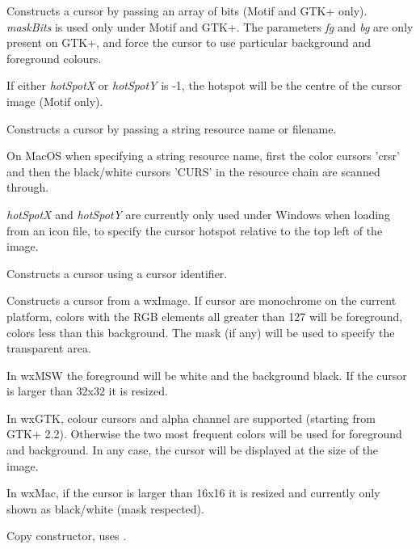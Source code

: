Constructs a cursor by passing an array of bits (Motif and GTK+ only). {\it maskBits} is used only under
Motif and GTK+. The parameters {\it fg} and {\it bg} are only present on GTK+, and force the
cursor to use particular background and foreground colours.

If either {\it hotSpotX} or {\it hotSpotY} is -1, the hotspot will be the centre of the cursor image (Motif only).


Constructs a cursor by passing a string resource name or filename.

On MacOS when specifying a string resource name, first the color cursors 'crsr' and then the black/white cursors 'CURS' in the resource chain are scanned through.

{\it hotSpotX} and {\it hotSpotY} are currently only used under Windows when loading from an
icon file, to specify the cursor hotspot relative to the top left of the image.


Constructs a cursor using a cursor identifier.


Constructs a cursor from a wxImage. If cursor are monochrome on the current
platform, colors with the RGB elements all greater than 127 will be foreground,
colors less than this background. The mask (if any) will be used to specify the
transparent area.

In wxMSW the foreground will be white and the background black. If the cursor
is larger than 32x32 it is resized.

In wxGTK, colour cursors and alpha channel are supported (starting from GTK+
2.2). Otherwise the two most frequent colors will be used for foreground and
background. In any case, the cursor will be displayed at the size of the image.

In wxMac, if the cursor is larger than 16x16 it is resized and currently only
shown as black/white (mask respected).


Copy constructor, uses .



